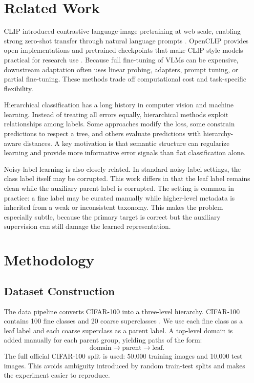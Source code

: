 \documentclass[conference]{IEEEtran}
\begin{document}
\section{Related Work}
CLIP introduced contrastive language-image pretraining at web scale, enabling
strong zero-shot transfer through natural language prompts \cite{radford2021clip}.
OpenCLIP provides open implementations and pretrained checkpoints that make
CLIP-style models practical for research use \cite{ilharco2021openclip}.
Because full fine-tuning of VLMs can be expensive, downstream adaptation often
uses linear probing, adapters, prompt tuning, or partial fine-tuning. These
methods trade off computational cost and task-specific flexibility.

Hierarchical classification has a long history in computer vision and machine
learning. Instead of treating all errors equally, hierarchical methods exploit
relationships among labels. Some approaches modify the loss, some constrain
predictions to respect a tree, and others evaluate predictions with
hierarchy-aware distances. A key motivation is that semantic structure can
regularize learning and provide more informative error signals than flat
classification alone.

Noisy-label learning is also closely related. In standard noisy-label settings,
the class label itself may be corrupted. This work differs in that the leaf
label remains clean while the auxiliary parent label is corrupted. The setting
is common in practice: a fine label may be curated manually while higher-level
metadata is inherited from a weak or inconsistent taxonomy. This makes the
problem especially subtle, because the primary target is correct but the
auxiliary supervision can still damage the learned representation.

\section{Methodology}
\subsection{Dataset Construction}
The data pipeline converts CIFAR-100 into a three-level hierarchy. CIFAR-100
contains 100 fine classes and 20 coarse superclasses \cite{krizhevsky2009learning}.
We use each fine class as a leaf label and each coarse superclass as a parent
label. A top-level domain is added manually for each parent group, yielding
paths of the form:
\begin{equation}
\mathrm{domain} \rightarrow \mathrm{parent} \rightarrow \mathrm{leaf}.
\end{equation}
The full official CIFAR-100 split is used: 50,000 training images and 10,000
test images. This avoids ambiguity introduced by random train-test splits and
makes the experiment easier to reproduce.
\end{document}
